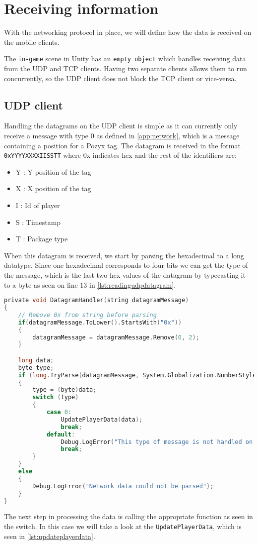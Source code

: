 \section{Receiving information}\label{sec:receiving-the-information}
With the networking protocol in place, we will define how the data is received on the mobile clients.

The \texttt{in-game} scene in Unity has an \texttt{empty object} which handles receiving data from the UDP and TCP clients.
Having two separate clients allows them to run concurrently, so the UDP client does not block the TCP client or vice-versa.

\subsection*{UDP client}
Handling the datagrams on the UDP client is simple as it can currently only receive a message with type 0 as defined in \autoref{app:network}, which is a message containing a position for a Pozyx tag.
The datagram is received in the format \texttt{0xYYYYXXXXIISSTT} where 0x indicates hex and the rest of the identifiers are:
\begin{itemize}
    \item Y : Y position of the tag
    \item X : X position of the tag
    \item I : Id of player
    \item S : Timestamp
    \item T : Package type
\end{itemize}

\noindent
When this datagram is received, we start by parsing the hexadecimal to a long datatype.
Since one hexadecimal corresponds to four bits we can get the type of the message, which is the last two hex values of the datagram by typecasting it to a byte as seen on line 13 in \autoref{lst:readingudpdatagram}.

\begin{lstlisting}[caption={Processing datagrams in UDP client}, captionpos=b,language=C,label={lst:readingudpdatagram}]
private void DatagramHandler(string datagramMessage)
{
    // Remove 0x from string before parsing
    if(datagramMessage.ToLower().StartsWith("0x"))
    {
        datagramMessage = datagramMessage.Remove(0, 2);
    }

    long data;
    byte type;
    if (long.TryParse(datagramMessage, System.Globalization.NumberStyles.HexNumber, System.Globalization.CultureInfo.InvariantCulture, out data))
    {
        type = (byte)data;
        switch (type)
        {
            case 0:
                UpdatePlayerData(data);
                break;
            default:
                Debug.LogError("This type of message is not handled on UDP");
                break;
        }
    }
    else
    {
        Debug.LogError("Network data could not be parsed");
    }
}
\end{lstlisting}
\noindent 
The next step in processing the data is calling the appropriate function as seen in the switch. 
In this case we will take a look at the \texttt{UpdatePlayerData}, which is seen in \autoref{lst:updateplayerdata}.

